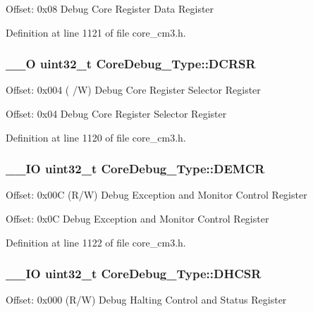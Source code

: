 Offset\-: 0x08 Debug Core Register Data Register 

Definition at line 1121 of file core\-\_\-cm3.\-h.

\hypertarget{struct_core_debug___type_afefa84bce7497652353a1b76d405d983}{
\subsubsection[{D\-C\-R\-S\-R}]{\setlength{\rightskip}{0pt plus 5cm}\-\_\-\-\_\-\-O {\bf uint32\-\_\-t} Core\-Debug\-\_\-\-Type\-::\-D\-C\-R\-S\-R}}\label{struct_core_debug___type_afefa84bce7497652353a1b76d405d983}
Offset\-: 0x004 ( /\-W) Debug Core Register Selector Register

Offset\-: 0x04 Debug Core Register Selector Register 

Definition at line 1120 of file core\-\_\-cm3.\-h.

\hypertarget{struct_core_debug___type_a5cdd51dbe3ebb7041880714430edd52d}{
\subsubsection[{D\-E\-M\-C\-R}]{\setlength{\rightskip}{0pt plus 5cm}\-\_\-\-\_\-\-I\-O {\bf uint32\-\_\-t} Core\-Debug\-\_\-\-Type\-::\-D\-E\-M\-C\-R}}\label{struct_core_debug___type_a5cdd51dbe3ebb7041880714430edd52d}
Offset\-: 0x00\-C (R/\-W) Debug Exception and Monitor Control Register

Offset\-: 0x0\-C Debug Exception and Monitor Control Register 

Definition at line 1122 of file core\-\_\-cm3.\-h.

\hypertarget{struct_core_debug___type_a25c14c022c73a725a1736e903431095d}{
\subsubsection[{D\-H\-C\-S\-R}]{\setlength{\rightskip}{0pt plus 5cm}\-\_\-\-\_\-\-I\-O {\bf uint32\-\_\-t} Core\-Debug\-\_\-\-Type\-::\-D\-H\-C\-S\-R}}\label{struct_core_debug___type_a25c14c022c73a725a1736e903431095d}
Offset\-: 0x000 (R/\-W) Debug Halting Control and Status Register


